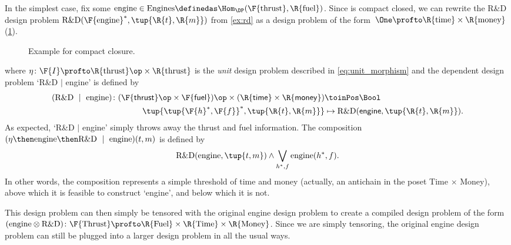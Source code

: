 \begin{example}
  \label{ex:rdproblem}
  In the simplest case, fix some $\text{engine} \in \text{Engines} \definedas \Hom_\DP(\F{\text{thrust}},\R{\text{fuel}})$. Since \DP is compact closed, we can rewrite the R\&D design problem $\text{R\&D}(\F{\text{engine}}^*, \tup{\R{t},\R{m}})$ from \cref{ex:rd} as a design problem of the form~$\One \profto \R{\text{time}} \times\R{\text{money}}$ (\cref{fig:excompactclosed}).
  \begin{figure}[h!]
    \begin{center}
    \end{center}
    \caption{Example for compact closure. \label{fig:excompactclosed}}
  \end{figure}
  where $\eta \colon \F{I} \profto \R{\text{thrust}}\op \times \R{\text{thrust}}$ is the \emph{unit} design problem described in \cref{eq:unit_morphism} and the dependent design problem `R\&D $\mid$ engine' is defined by
  \begin{equation}
    \begin{aligned}
    (\text{R\&D } \mid \text{ engine})
      \colon (\F{\mathsf{thrust}}\op \times \F{\mathsf{fuel}})\op \times (\R{\mathsf{time}} \times \R{\mathsf{money}}) &\toinPos \Bool \\
      \tup{\tup{\F{h}^*, \F{f}}^*, \tup{\R{t},\R{m}}} &\mapsto \text{R\&D}(\mathsf{engine}, \tup{\R{t},\R{m}}).
    \end{aligned}
  \end{equation}
  As expected, `R\&D $|$ engine' simply throws away the thrust and fuel information. The composition $(\eta \then \text{engine} \then \text{R\&D } \mid \text{ engine}) (t,m)$ is defined by
  \begin{equation}
    \text{R\&D}(\text{engine}, \tup{t,m}) \wedge \bigvee_{h^*,f} \text{engine}(h^*, f).
  \end{equation}
  In other words, the composition represents a simple threshold of time and money (actually, an antichain in the poset Time $\times$ Money), above which it is feasible to construct `engine', and below which it is not.

  This design problem can then simply be tensored with the original engine design problem to create a compiled design problem of the form $(\text{engine} \otimes \text{R\&D}) \colon \F{\text{Thrust}} \profto \R{\text{Fuel}} \times \R{\text{Time}} \times \R{\text{Money}}$. Since we are simply tensoring, the original engine design problem can still be plugged into a larger design problem in all the usual ways.
\end{example}

